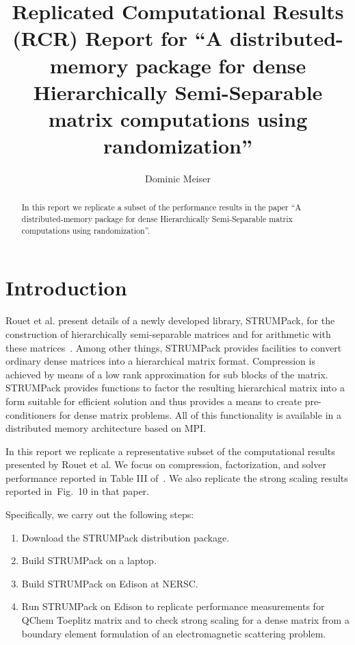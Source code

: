 \documentclass{acmsmall}
\begin{document}
\title{Replicated Computational Results (RCR) Report for
  ``A distributed-memory package for dense Hierarchically
    Semi-Separable matrix computations using randomization''}

\author{Dominic Meiser
}

\newcommand{\strumpack}{STRUMPack}

\begin{abstract}
  In this report we replicate a subset of the performance results
  in the paper ``A distributed-memory package for dense
  Hierarchically Semi-Separable matrix computations using
  randomization''.
\end{abstract}

\maketitle 

\section{Introduction}

Rouet et al. present details of a newly developed library,
\strumpack{}, for the construction of hierarchically
semi-separable matrices and for arithmetic with these
matrices~\cite{rouet:strumpack}.  Among other things,
\strumpack{} provides facilities to convert ordinary dense
matrices into a hierarchical matrix format.  Compression is
achieved by means of a low rank approximation for sub blocks of
the matrix.  \strumpack{} provides functions to factor the
resulting hierarchical matrix into a form suitable for efficient
solution and thus provides a means to create pre-conditioners for
dense matrix problems.  All of this functionality is available in
a distributed memory architecture based on MPI.

In this report we replicate a representative subset of the
computational results presented by Rouet et al.  We focus on
compression, factorization, and solver performance reported in
Table III of~\cite{rouet:strumpack}.  We also replicate the
strong scaling results reported in~Fig.~10
in that paper.

Specifically, we carry out the following steps:
\begin{enumerate}
  \item Download the \strumpack{} distribution package.
  \item Build \strumpack{} on a laptop.
  \item Build \strumpack{} on Edison at NERSC.
  \item Run \strumpack{} on Edison to replicate performance
    measurements for QChem Toeplitz matrix and to check strong
    scaling for a dense matrix from a boundary element formulation
    of an electromagnetic scattering problem.
\end{enumerate}
\end{document}
